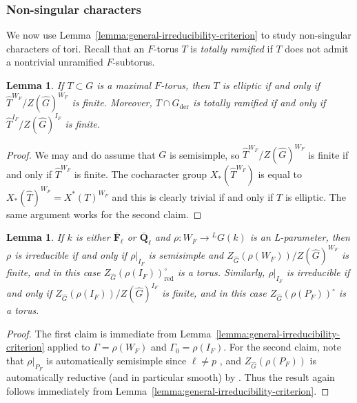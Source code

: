 \documentclass[reqno]{amsart}
\numberwithin{equation}{subsection}
\newcommand{\F}{\mathbf{F}}
\newcommand{\Q}{\mathbf{Q}}
\newcommand{\ol}[1]{\overline{#1}}
\newcommand{\wh}[1]{\widehat{#1}}
\newcommand{\ld}{{}^L}
\DeclareMathOperator{\der}{der}
\newtheorem{lemma}[thm]{Lemma}
\theoremstyle{remark}
\numberwithin{equation}{subsection}
\numberwithin{figure}{subsection}
\begin{document}
\subsubsection{Non-singular characters}

We now use Lemma~\ref{lemma:general-irreducibility-criterion} to study non-singular characters of tori. Recall that an $F$-torus $T$ is \textit{totally ramified} if $T$ does not admit a nontrivial unramified $F$-subtorus.

\begin{lemma}\label{lemma:elliptic-finite-invariants}
If $T \subset G$ is a maximal $F$-torus, then $T$ is elliptic if and only if $\widehat{T}^{W_F}/Z(\wh G)^{W_F}$ is finite. Moreover, $T \cap G_{\der}$ is totally ramified if and only if $\wh T^{I_F}/Z(\wh G)^{I_F}$ is finite.
\end{lemma}

\begin{proof}
We may and do assume that $G$ is semisimple, so $\widehat{T}^{W_F}/Z(\wh G)^{W_F}$ is finite if and only if $\widehat{T}^{W_F}$ is finite. The cocharacter group $X_*(\widehat{T}^{W_F})$ is equal to $X_*(\widehat{T})^{W_F} = X^*(T)^{W_F}$ and this is clearly trivial if and only if $T$ is elliptic. The same argument works for the second claim.
\end{proof}

\begin{lemma}\label{lemma:irreducibility-criterion}
If $k$ is either $\ol{\F}_\ell$ or $\ol{\Q}_\ell$ and $\rho\colon W_F \to \ld G(k)$ is an L-parameter, then $\rho$ is irreducible if and only if $\rho|_{I_F}$ is semisimple and $Z_{\widehat{G}}(\rho(W_F))/Z(\widehat{G})^{W_F}$ is finite, and in this case $Z_{\widehat{G}}(\rho(I_F))^\circ_{\mathrm{red}}$ is a torus. Similarly, $\rho|_{I_F}$ is irreducible if and only if $Z_{\widehat{G}}(\rho(I_F))/Z(\widehat{G})^{I_F}$ is finite, and in this case $Z_{\widehat{G}}(\rho(P_F))^\circ$ is a torus. 
\end{lemma}

\begin{proof}
The first claim is immediate from Lemma~\ref{lemma:general-irreducibility-criterion} applied to $\Gamma = \rho(W_F)$ and $\Gamma_0 = \rho(I_F)$. For the second claim, note that $\rho|_{P_F}$ is automatically semisimple since $\ell \neq p$ \cite[Lemma 2.6]{BMR05}, and $Z_{\widehat{G}}(\rho(P_F))$ is automatically reductive (and in particular smooth) by \cite[Theorem 2.1]{PY02}. Thus the result again follows immediately from Lemma~\ref{lemma:general-irreducibility-criterion}.
\end{proof}
\end{document}
